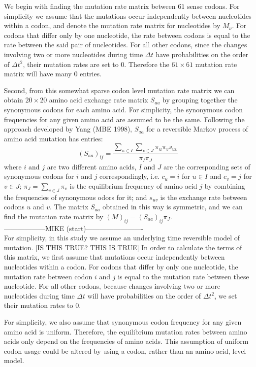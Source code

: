 We begin with finding the mutation rate matrix between $61$ sense codons. 
For simplicity we assume that the mutations occur independently between nucleotides within a codon, and denote the mutation rate matrix for nucleotides by $M_{\nu}$. 
For codons that differ only by one nucleotide, the rate between codons is equal to the rate between the said pair of nucleotides.
For all other codons, since the changes involving two or more nucleotides during time $\Delta t$ have probabilities on the order of $\Delta t^2$, their mutation rates are set to $0$.
Therefore the $61 \times 61$ mutation rate matrix will have many $0$ entries.


Second, from this somewhat sparse codon level mutation rate matrix we can obtain $20 \times 20$ amino acid exchange rate matrix $S_{aa}$ by grouping together the synonymous codons for each amino acid. 
For simplicity, the synonymous codon frequencies for any given amino acid are assumed to be the same. 
Following the approach developed by Yang (MBE 1998), $S_{aa}$ for a reversible Markov process of amino acid mutation has entries:
\[(S_{aa})_{ij} = \frac{\sum_{u \in I} \sum_{v \in J} \pi_u \pi_v s_{uv}}{\pi_I \pi_J}\]
where $i$ and $j$ are two different amino acids, $I$ and $J$ are the corresponding sets of synonymous codons for $i$ and $j$ correspondingly, i.e. $c_u = i$ for $u\in I$ and $c_v = j$ for $v \in J$; $\pi_J = \sum_{v \in J} \pi_v$ is the equilibrium frequency of amino acid $j$ by combining the frequencies of synonymous odors for it; and $s_{uv}$ is the exchange rate between codons $u$ and $v$. 
The matrix $S_{aa}$ obtained in this way is symmetric, and we can find the mutation rate matrix by $(M)_{ij} = (S_{aa})_{ij} \pi_J$.\\

------------------MIKE (start)-------------------------\\
For simplicity, in this study we assume an underlying time reversible model of mutation. [IS THIS TRUE? THIS IS TRUE]
In order to calculate the terms of this matrix, we first assume that mutations occur independently between nucleotides within a codon.
For codons that differ by only one nucleotide, the mutation rate between codon $i$ and $j$ is equal to the mutation rate between these nucleotide.
For all other codons, because changes involving two or more nucleotides during time $\Delta t$ will have probabilities on the order of $\Delta t^2$, we set their mutation rates to 0.

For simplicity, we also assume that synonymous codon frequency for any given amino acid is uniform.
Therefore, the equilibrium mutation rates between amino acids only depend on the frequencies of amino acids.
This assumption of uniform codon usage could be altered by using a codon, rather than an amino acid, level model.


